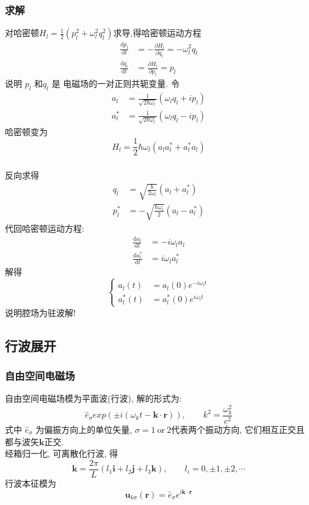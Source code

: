 \begin{frame}
    \frametitle{求解}
          对哈密顿$H_l= \frac{1}{2}(p_l ^2 + \omega_l ^2 q_l ^2 )$求导,得哈密顿运动方程
        \[ \begin{aligned}
            \frac{\mathrm{d}p_l}{\mathrm{d}t} &= - \frac{\partial H_l}{\partial q_l} = - \omega ^2 _l q_l \\ 
            \frac{\mathrm{d}q_l}{\mathrm{d}t} &= \frac{\partial H_l}{\partial p_l} =p_l
         \end{aligned} 
        \] 
    说明 $ p_l $ 和$q_l$ 是 电磁场的一对正则共轭变量.  令  
    \[ \begin{aligned}
        a_l &= \frac{1}{\sqrt{2\hbar \omega_l}} (\omega_lq_l+i p_l) \\ 
        a_l ^* &= \frac{1}{\sqrt{2\hbar \omega_l}} (\omega_lq_l-i p_l)  
     \end{aligned} 
    \] 
    哈密顿变为
    \[ H_l= \frac{1}{2}\hbar \omega_l (a_l a_l ^* + a_l ^*a_l )  \]
\end{frame}


\begin{frame}
    \frametitle{}
     反向求得 
     \[ \begin{aligned}
        q_l &= \sqrt{\frac{\hbar}{ 2\omega_l}} (a_l+ a_l ^*) \\ 
        p_l ^* &= -\sqrt{\frac{\hbar\omega_l}{2 }} (a_l- a_l ^*)  
     \end{aligned} 
    \] 
     代回哈密顿运动方程: 
     \[ \begin{aligned}
        \frac{\mathrm{d}a_l}{\mathrm{d}t} &= - i\omega_l a_l \\ 
        \frac{\mathrm{d}a_l ^*}{\mathrm{d}t} &=  i \omega_l a_l ^*
     \end{aligned} 
    \] 
    解得 
    \[ \begin{cases}
       a_l(t) &= a_l(0)e^{- i\omega_l t} \\ 
       a_l ^*(t) &= a_l ^* (0) e^{i \omega_l t}
    \end{cases} 
   \] 
   说明腔场为驻波解!
\end{frame}


\subsection{行波展开}

\begin{frame}
    \frametitle{自由空间电磁场}
    自由空间电磁场模为平面波(行波), 解的形式为:
    \[  \hat{e}_\sigma exp (\pm i (\omega_k t - \mathbf{k}\cdot \mathbf{r})), \qquad k^2 =\frac{\omega_k ^2}{c^2} \]
    式中 $\hat{e}_\sigma $ 为偏振方向上的单位矢量, $\sigma=1 ~\text{or} ~2$代表两个振动方向, 它们相互正交且都与波矢$\mathbf{k}$正交. \\ \vspace*{1em} 
    经箱归一化, 可离散化行波, 得 
    \[ \mathbf{k} = \frac{2\pi}{L} (l_1 \mathbf{i} + l_2 \mathbf{j}+ l_3 \mathbf{k}), \qquad l_i= 0, \pm 1, \pm 2, \cdots \]
    行波本征模为
    \[ \mathbf{u}_{k\sigma} (\mathbf{r}) = \hat{e}_\sigma e^{i \mathbf{k}\cdot \mathbf{r}}\]
\end{frame}

